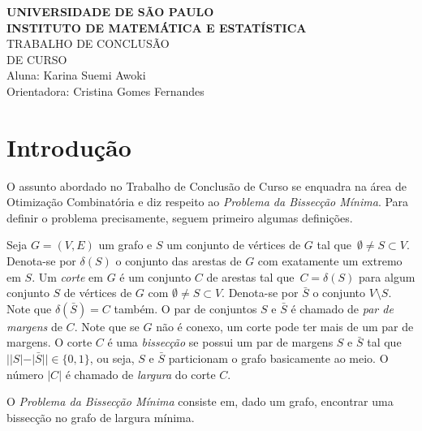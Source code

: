 \documentclass[a4paper,12pt]{article}
\begin{document}
\begin{center}
   {\large \textbf{UNIVERSIDADE DE SÃO PAULO}} \\[1.4cm]
   
   {\large \textbf{INSTITUTO DE MATEMÁTICA E ESTATÍSTICA}}\\[4.2cm]
   
   {\Huge TRABALHO DE CONCLUSÃO }\\[0.3cm]
   {\Huge DE CURSO }\\[9cm]
   
   {\large { Aluna: Karina Suemi Awoki}}\\[0.3cm]
   
   {\large { Orientadora: Cristina Gomes Fernandes}}
   

\end{center}

\newpage


\section{Introdução}

O assunto abordado no Trabalho de Conclusão de Curso se
enquadra na área de Otimização Combinatória e diz respeito ao 
\emph{Problema da Bissecção Mínima}. Para definir o problema 
precisamente, seguem primeiro algumas definições. 

Seja $G=(V,E)$ um grafo e $S$ um conjunto de vértices de $G$ tal 
que~${\emptyset \neq S \subset V}$. 
Denota-se por $\delta(S)$ o conjunto das arestas de $G$ com 
exatamente um extremo em $S$. Um \emph{corte} em $G$ é um conjunto
$C$ de arestas tal que~${C = \delta(S)}$ para algum conjunto $S$ 
de vértices de $G$ com $\emptyset \neq S \subset V$. 
Denota-se por $\bar{S}$ o conjunto $V \setminus S$. 
Note que $\delta(\bar{S}) = C$ também. 
O par de conjuntos $S$ e $\bar{S}$ é chamado de 
\emph{par de margens} de $C$. 
Note que se $G$ não é conexo, um corte pode ter mais de um par de 
margens. 
O corte $C$ é uma \emph{bissecção} se possui um par de margens $S$ 
e $\bar{S}$ tal que $||S|- |\bar{S}|| \in \{0,1\}$, ou seja, $S$ e 
$\bar{S}$ particionam o grafo basicamente ao meio. 
O número $|C|$ é chamado de \emph{largura} do corte $C$. 

O \emph{Problema da Bissecção Mínima} consiste em, dado um grafo, 
encontrar uma bissecção no grafo de largura mínima.
\end{document}

